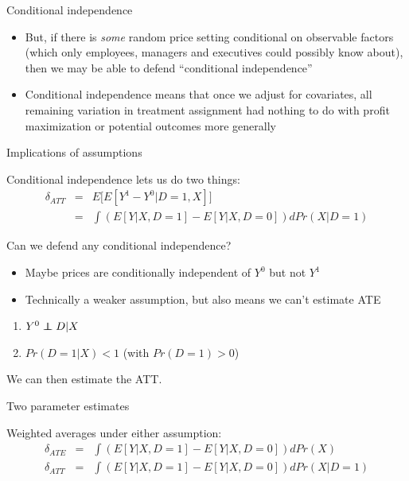 \documentclass{beamer}
\newcommand\independent{\protect\mathpalette{\protect\independenT}{\perp}}
\def\independenT#1#2{\mathrel{\rlap{$#1#2$}\mkern2mu{#1#2}}}
\begin{document}
\begin{frame}{Conditional independence}

\begin{itemize}
\item But, if there is \emph{some} random price setting conditional on observable factors (which only employees, managers and executives could possibly know about), then we may be able to defend ``conditional independence''
\item Conditional independence means that once we adjust for covariates, all remaining variation in treatment assignment had nothing to do with profit maximization or potential outcomes more generally
\end{itemize}

\end{frame}

\begin{frame}{Implications of assumptions}

Conditional independence lets us do two things:
		\begin{eqnarray*}
		\delta_{ATT} &=& E\bigg[ E[Y^1-Y^0 | D=1,X] \bigg] \\
		&=& \int \left(E[Y|X,D=1] - E[Y|X,D=0]\right)dPr(X|D=1)
		\end{eqnarray*}
\end{frame}


\begin{frame}{Can we defend any conditional independence?}

\begin{itemize}
	\item Maybe prices are conditionally independent of $Y^0$ but not $Y^1$
	\item Technically a weaker assumption, but also means we can't estimate ATE
\end{itemize}

\begin{enumerate}
  \item $Y^0 \independent{D} | X$ 
  \item $Pr(D=1|X)<1$ (with $Pr(D=1)>0$)
\end{enumerate}

\bigskip
We can then estimate the ATT.

\end{frame}


\begin{frame}{Two parameter estimates}


Weighted averages under either assumption:
		\begin{eqnarray*}
		\delta_{ATE} &=& \int \left(E[Y|X,D=1] - E[Y|X,D=0]\right)dPr(X) \\
		\delta_{ATT} &=& \int \left(E[Y|X,D=1] - E[Y|X,D=0]\right)dPr(X|D=1)
		\end{eqnarray*}
\end{frame}
\end{document}

